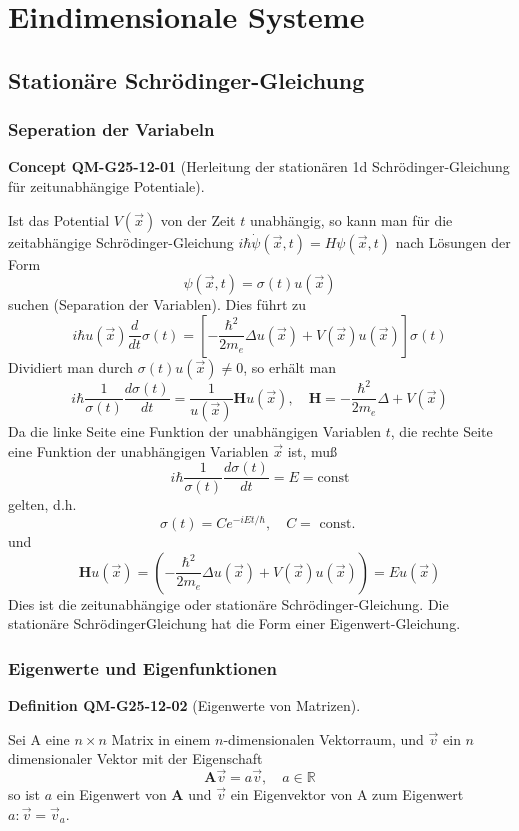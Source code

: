 \documentclass[10pt, letterpaper]{article}
\newcommand{\CustomHeading}[3]{%
  \par\medskip\noindent%
  \textbf{#1 #2} \textnormal{(#3)}.\enskip%
}
\newenvironment{DEF}[2]{\begin{unitbox}\CustomHeading{Definition}{#1}{#2}}{\end{unitbox}}
\newenvironment{CONC}[2]{\begin{unitbox}\CustomHeading{Concept}{#1}{#2}}{\end{unitbox}}
\begin{document}
\pagebreak


\section{Eindimensionale Systeme}




\subsection{Stationäre Schrödinger-Gleichung}


\subsubsection*{Seperation der Variabeln}


\begin{CONC}{QM-G25-12-01}{Herleitung der stationären 1d Schrödinger-Gleichung für zeitunabhängige Potentiale}
Ist das Potential $V(\vec{x})$ von der Zeit $t$ unabhängig, so kann man für die zeitabhängige Schrödinger-Gleichung $i \hbar \dot{\psi}(\vec{x}, t)=H \psi(\vec{x}, t)$ nach Lösungen der Form
$$
\psi(\vec{x}, t)=\sigma(t) u(\vec{x})
$$
suchen (Separation der Variablen). Dies führt zu
$$
i \hbar u(\vec{x}) \frac{d}{d t} \sigma(t)=\left[-\frac{\hbar^{2}}{2 m_{e}} \Delta u(\vec{x})+V(\vec{x}) u(\vec{x})\right] \sigma(t)
$$
Dividiert man durch $\sigma(t) u(\vec{x}) \neq 0$, so erhält man
$$
i \hbar \frac{1}{\sigma(t)} \frac{d \sigma(t)}{d t}=\frac{1}{u(\vec{x})} \mathbf{H} u(\vec{x}), \quad \mathbf{H}=-\frac{\hbar^{2}}{2 m_{e}} \Delta+V(\vec{x})
$$
Da die linke Seite eine Funktion der unabhängigen Variablen $t$, die rechte Seite eine Funktion der unabhängigen Variablen $\vec{x}$ ist, muß
$$
i \hbar \frac{1}{\sigma(t)} \frac{d \sigma(t)}{d t}=E=\mathrm{const}
$$
gelten, d.h.
$$
\sigma(t)=C e^{-i E t / \hbar}, \quad C=\text { const. }
$$
und
$$
\mathbf{H} u(\vec{x})=\left(-\frac{\hbar^{2}}{2 m_{e}} \Delta u(\vec{x})+V(\vec{x}) u(\vec{x})\right)=E u(\vec{x})
$$
Dies ist die zeitunabhängige oder stationäre Schrödinger-Gleichung. Die stationäre SchrödingerGleichung hat die Form einer Eigenwert-Gleichung.
\end{CONC}



\subsubsection*{Eigenwerte und Eigenfunktionen}


\begin{DEF}{QM-G25-12-02}{Eigenwerte von Matrizen}
Sei A eine $n \times n$ Matrix in einem $n$-dimensionalen Vektorraum, und $\vec{v}$ ein $n$ dimensionaler Vektor mit der Eigenschaft
$$
\mathbf{A} \vec{v}=a \vec{v}, \quad a \in \mathbb{R}
$$
so ist $a$ ein Eigenwert von $\mathbf{A}$ und $\vec{v}$ ein Eigenvektor von A zum Eigenwert $a: \vec{v}=\vec{v}_{a}$.
\end{DEF}
\end{document}
